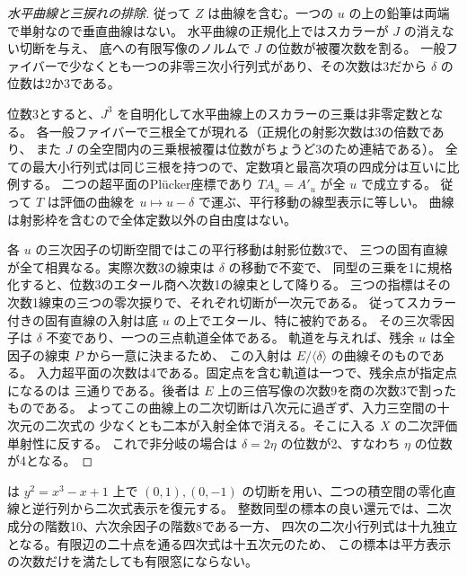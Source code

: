 \begin{proof}[水平曲線と三捩れの排除]
従って $Z$ は曲線を含む。一つの $u$ の上の鉛筆は両端で単射なので垂直曲線はない。
水平曲線の正規化上ではスカラーが $J$ の消えない切断を与え、
底への有限写像のノルムで $J$ の位数が被覆次数を割る。
一般ファイバーで少なくとも一つの非零三次小行列式があり、その次数は3だから
$\delta$ の位数は2か3である。

位数3とすると、$J^3$ を自明化して水平曲線上のスカラーの三乗は非零定数となる。
各一般ファイバーで三根全てが現れる（正規化の射影次数は3の倍数であり、
また $J$ の全空間内の三乗根被覆は位数がちょうど3のため連結である）。
全ての最大小行列式は同じ三根を持つので、定数項と最高次項の四成分は互いに比例する。
二つの超平面のPl\"ucker座標であり $T A_u=A'_u$ が全 $u$ で成立する。
従って $T$ は評価の曲線を $u\mapsto u-\delta$ で運ぶ、平行移動の線型表示に等しい。
曲線は射影枠を含むので全体定数以外の自由度はない。

各 $u$ の三次因子の切断空間ではこの平行移動は射影位数3で、
三つの固有直線が全て相異なる。実際次数3の線束は $\delta$ の移動で不変で、
同型の三乗を1に規格化すると、位数3のエタール商へ次数1の線束として降りる。
三つの指標はその次数1線束の三つの零次捩りで、それぞれ切断が一次元である。
従ってスカラー付きの固有直線の入射は底 $u$ の上でエタール、特に被約である。
その三次零因子は $\delta$ 不変であり、一つの三点軌道全体である。
軌道を与えれば、残余 $u$ は全因子の線束 $P$ から一意に決まるため、
この入射は $E/\langle\delta\rangle$ の曲線そのものである。
入力超平面の次数は4である。固定点を含む軌道は一つで、残余点が指定点になるのは
三通りである。後者は $E$ 上の三倍写像の次数9を商の次数3で割ったものである。
よってこの曲線上の二次切断は八次元に過ぎず、入力三空間の十次元の二次式の
少なくとも二本が入射全体で消える。そこに入る $X$ の二次評価単射性に反する。
これで非分岐の場合は $\delta=2\eta$ の位数が2、すなわち $\eta$ の位数が4となる。
\end{proof}

 は $y^2=x^3-x+1$ 上で
$(0,1),(0,-1)$ の切断を用い、二つの積空間の零化直線と逆行列から二次式表示を復元する。
整数同型の標本の良い還元では、二次成分の階数10、六次余因子の階数8である一方、
四次の二次小行列式は十九独立となる。有限辺の二十点を通る四次式は十五次元のため、
この標本は平方表示の次数だけを満たしても有限窓にならない。
